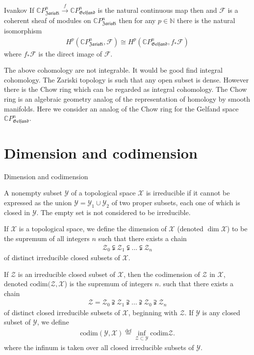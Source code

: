 \documentclass{beamer}
\theoremstyle{plain}
\newcommand{\bean}{\begin{eqnarray*}}
\newcommand{\eean}{\end{eqnarray*}}
\newcommand{\C}{\mathbb{C}}
\newcommand{\codim}{\mathrm{codim}}
\newcommand{\sX}{\mathcal{X}}       %
\newcommand{\sY}{\mathcal{Y}}       %
\newcommand{\sZ}{\mathcal{Z}}       %
\newcommand{\N}{\mathbb{N}}                  %
\newcommand{\bydef}{\stackrel{\mathrm{def}}{=}}
\begin{document}
\begin{frame}
\begin{theorem}\alert{Ivankov}
If $\C P^n_{\mathfrak{Zariski}}\xrightarrow{f} \C P^n_{\mathfrak{Gelfand}}$  is the natural continuous map then and $\mathscr F$ is a coherent sheaf of modules on $\C P^n_{\mathfrak{Zariski}}$ then for any $p\in \N$ there is the natural  isomorphism
\bean
H^p\left( \C P^n_{\mathfrak{Zariski}}, \mathscr F\right) \cong H^p\left( \C P^n_{\mathfrak{Gelfand}}, f_* \mathscr F\right)
\eean 
where $f_* \mathscr F$ is the direct image of $\mathscr F$.
 \end{theorem}
 The above cohomology are not integrable. It would be good find integral cohomology. The Zariski topology is such that any open subset is dense. However there is the \alert{Chow ring} which can be regarded as integral cohomology. The {Chow ring} is an algebraic geometry analog of the representation of homology by smooth manifolds. Here we consider an analog of the {Chow ring} for the Gelfand space $\C P^n_{\mathfrak{Gelfand}}$.
 \end{frame}
 \section{Dimension and codimension}
 \begin{frame}
 	{\Large Dimension and codimension} 
 		\begin{definition}\label{top_irreducible_defn}
	A nonempty subset $\sY$ of a topological space $\sX$ is \alert{ irreducible} if 
	it cannot be expressed as the union $\sY = \sY_1 \cup \sY_2$ of two proper subsets, each one of which is closed in $\sY$. The empty set is not considered to be 
	irreducible. 
\end{definition}
\begin{definition}\label{top_dimension_defn}
	If $\sX$ is a topological space, we define the \alert{ dimension} of $\sX$ (denoted 
	$\dim \sX$) to be the supremum of all integers $n$ such that there exists a chain 
	\bean
	\sZ_0 \subsetneqq	\sZ_1 \subsetneqq...\subsetneqq	\sZ_n 					\eean 
	of distinct irreducible closed subsets of $\sX$.
	\end{definition}
\end{frame}
\begin{frame}
	\begin{definition}\label{top_codimension_defn}
		If $\sZ$ is an irreducible closed subset of $\sX$, then the 
		\alert{ codimension} of $\sZ$ in $\sX$, denoted $\codim(\sZ,\sX$) is the supremum of integers $n$.
		such that there exists a chain 
		\bean
		\sZ = \sZ_0 \supsetneqq \sZ_1 \supsetneqq... \supsetneqq \sZ_0 \supsetneqq \sZ_n 
		\eean 
		of distinct closed irreducible subsets of $\sX$, beginning with $\sZ$. If $\sY$ is any 
		closed subset of $\sY$, we define 
		\bean
		\codim(\sY,\sX)\bydef \inf_{\sZ \subset \sY} \codim \sZ.
		\eean
		where the infinum is taken over all closed irreducible subsets of $\sY$. 
	\end{definition} 
 \end{frame}
\end{document}
